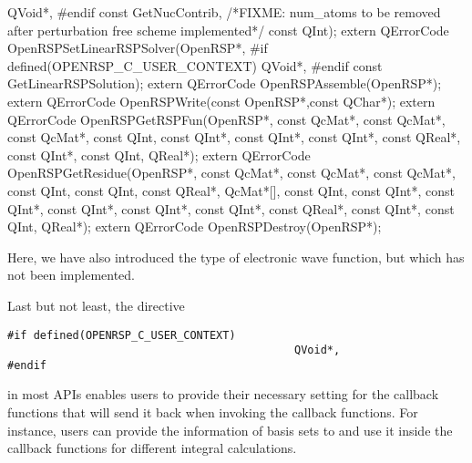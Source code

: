                                         QVoid*,
#endif 
                                        const GetNucContrib,
/*FIXME: num_atoms to be removed after perturbation free scheme implemented*/
                                        const QInt);
extern QErrorCode OpenRSPSetLinearRSPSolver(OpenRSP*,
#if defined(OPENRSP_C_USER_CONTEXT)
                                            QVoid*,
#endif
                                            const GetLinearRSPSolution);
extern QErrorCode OpenRSPAssemble(OpenRSP*);
extern QErrorCode OpenRSPWrite(const OpenRSP*,const QChar*);
extern QErrorCode OpenRSPGetRSPFun(OpenRSP*,
                                   const QcMat*,
                                   const QcMat*,
                                   const QcMat*,
                                   const QInt,
                                   const QInt*,
                                   const QInt*,
                                   const QInt*,
                                   const QReal*,
                                   const QInt*,
                                   const QInt,
                                   QReal*);
extern QErrorCode OpenRSPGetResidue(OpenRSP*,
                                    const QcMat*,
                                    const QcMat*,
                                    const QcMat*,
                                    const QInt,
                                    const QInt,
                                    const QReal*,
                                    QcMat*[],
                                    const QInt,
                                    const QInt*,
                                    const QInt*,
                                    const QInt*,
                                    const QInt*,
                                    const QInt*,
                                    const QReal*,
                                    const QInt*,
                                    const QInt,
                                    QReal*);
extern QErrorCode OpenRSPDestroy(OpenRSP*);

\nwendcode{}Here, we have also introduced the type of electronic wave function, but which
has not been implemented.

Last but not least, the directive
\begin{Verbatim}
#if defined(OPENRSP_C_USER_CONTEXT)
                                            QVoid*,
#endif
\end{Verbatim}
in most \LibName APIs enables users to provide their necessary setting for the
callback functions that \LibName will send it back when invoking the callback
functions. For instance, users can provide the information of basis sets to
\LibName and use it inside the callback functions for different integral
calculations.


